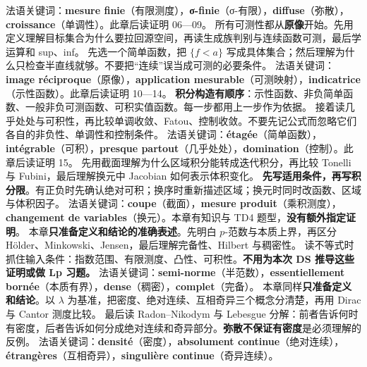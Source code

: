 法语关键词：\textbf{mesure finie}（有限测度），\textbf{σ-finie}（σ-有限），\textbf{diffuse}（弥散），\textbf{croissance}（单调性）。此章后读证明 06—09。
所有可测性都从\textbf{原像}开始。先用定义理解目标集合为什么要拉回源空间，再读生成族判别与连续函数可测，最后学运算和 sup、inf。
先选一个简单函数，把 $\{f<a\}$ 写成具体集合；然后理解为什么只检查半直线就够。不要把“连续”误当成可测的必要条件。
法语关键词：\textbf{image réciproque}（原像），\textbf{application mesurable}（可测映射），\textbf{indicatrice}（示性函数）。此章后读证明 10—14。
\textbf{积分构造有顺序}：示性函数、非负简单函数、一般非负可测函数、可积实值函数。每一步都用上一步作为依据。
接着读几乎处处与可积性，再比较单调收敛、Fatou、控制收敛。不要先记公式而忽略它们各自的非负性、单调性和控制条件。
法语关键词：\textbf{étagée}（简单函数），\textbf{intégrable}（可积），\textbf{presque partout}（几乎处处），\textbf{domination}（控制）。此章后读证明 15。
先用截面理解为什么区域积分能转成迭代积分，再比较 Tonelli 与 Fubini，最后理解换元中 Jacobian 如何表示体积变化。
\textbf{先写适用条件，再写积分限}。有正负时先确认绝对可积；换序时重新描述区域；换元时同时改函数、区域与体积因子。
法语关键词：\textbf{coupe}（截面），\textbf{mesure produit}（乘积测度），\textbf{changement de variables}（换元）。本章有知识与 TD4 题型，\textbf{没有额外指定证明}。
本章\textbf{只准备定义和结论的准确表述}。先明白 $p$-范数与本质上界，再区分 Hölder、Minkowski、Jensen，最后理解完备性、Hilbert 与稠密性。
读不等式时抓住输入条件：指数范围、有限测度、凸性、可积性。\textbf{不用为本次 DS 推导这些证明或做 Lp 习题。}
法语关键词：\textbf{semi-norme}（半范数），\textbf{essentiellement bornée}（本质有界），\textbf{dense}（稠密），\textbf{complet}（完备）。
本章同样\textbf{只准备定义和结论}。以 $\lambda$ 为基准，把密度、绝对连续、互相奇异三个概念分清楚，再用 Dirac 与 Cantor 测度比较。
最后读 Radon–Nikodym 与 Lebesgue 分解：前者告诉何时有密度，后者告诉如何分成绝对连续和奇异部分。\textbf{弥散不保证有密度}是必须理解的反例。
法语关键词：\textbf{densité}（密度），\textbf{absolument continue}（绝对连续），\textbf{étrangères}（互相奇异），\textbf{singulière continue}（奇异连续）。
